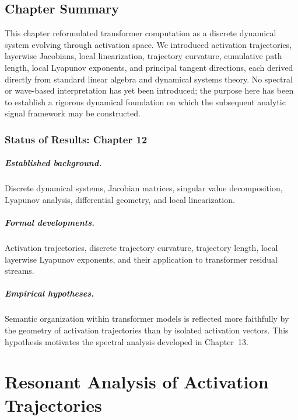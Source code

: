 \documentclass[11pt,twoside,openright]{book}
\numberwithin{equation}{chapter}
\theoremstyle{definition}
\theoremstyle{plain}
\theoremstyle{remark}
\theoremstyle{definition}
\begin{document}
\section{Chapter Summary}

This chapter reformulated transformer computation as a discrete
dynamical system evolving through activation space. We introduced
activation trajectories, layerwise Jacobians, local linearization,
trajectory curvature, cumulative path length, local Lyapunov exponents,
and principal tangent directions, each derived directly from standard
linear algebra and dynamical systems theory. No spectral or wave-based
interpretation has yet been introduced; the purpose here has been to
establish a rigorous dynamical foundation on which the subsequent
analytic signal framework may be constructed.

\subsection*{Status of Results: Chapter 12}

\paragraph{Established background.} Discrete dynamical systems, Jacobian
matrices, singular value decomposition, Lyapunov analysis, differential
geometry, and local linearization.

\paragraph{Formal developments.} Activation trajectories, discrete
trajectory curvature, trajectory length, local layerwise Lyapunov
exponents, and their application to transformer residual streams.

\paragraph{Empirical hypotheses.} Semantic organization within transformer
models is reflected more faithfully by the geometry of activation
trajectories than by isolated activation vectors. This hypothesis
motivates the spectral analysis developed in Chapter~13.

\chapter{Resonant Analysis of Activation Trajectories}
\label{ch:resonant-analysis}
\end{document}
